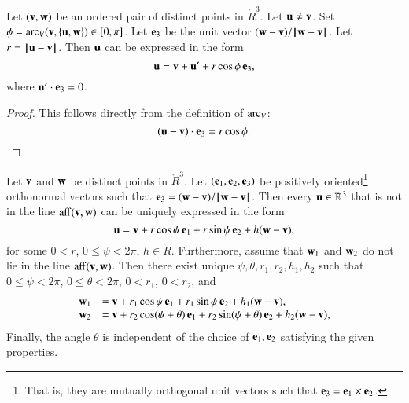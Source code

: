 \begin{lemma}[zenith]
Let $(\v,\w)$ be an ordered pair of distinct points in $\ring{R}^3$.
Let $\u\ne \v$.  Set $\phi = \arc_V(\v,\{\u,\w\})\in[0,\pi]$.
Let $\e_3$ be the unit vector $(\w-\v)/\norm{\w}{\v}$.  Let $r = \norm{\u}{\v}$.
Then $\u$
can be expressed in the form
   $$
   \u = \v + \u' +
   r\cos\phi\, \e_3,
   $$
where $\u'\cdot \e_3 = 0$.
%
%
%
\end{lemma}

\begin{proof} This follows directly from the definition of $\arc_V$:
  $$(\u-\v)\cdot \e_3 = r\cos\phi.$$
\end{proof}



\begin{lemma}
Let $\v$ and $\w$ be distinct points in 
$\ring{R}^3$.  Let $(\e_1,\e_2,\e_3)$ be positively oriented\footnote{That is, they are mutually orthogonal unit vectors such that $\e_3 = \e_1 \times \e_2$.} orthonormal
vectors such that $\e_3 = (\w-\v)/\norm{\w}{\v}$.
Then every
$\u\in\ring{R}^3$ that is not in the line $\op{aff}(\v,\w)$
can be uniquely expressed in the form
   $$
   \u = \v + r\cos\psi\, \e_1 + r\sin\psi\, \e_2 + h (\w-\v),
   $$
%
%
for some $0< r$, $0\le \psi < 2\pi$, $h\in\ring{R}$.
Furthermore,
assume that $\w_1$ and $\w_2$ do
not lie in the line $\op{aff}(\v,\w)$.
Then there exist unique $\psi,\theta,r_1,r_2,h_1,h_2$
 such
that $0\le\psi<2\pi$, $0\le\theta < 2\pi$, $0 < r_1$, $0 < r_2$, and
  $$
  \begin{array}{lll}
    \w_1 &= \v + r_1\cos\psi\, \e_1 + r_1\sin\psi\, \e_2 + h_1(\w-\v),\\
    \w_2 &= \v + r_2\cos(\psi+\theta)\, \e_1 + r_2\sin(\psi+\theta)\, \e_2 
     + h_2(\w-\v),\\
\end{array}
  $$
Finally, the angle $\theta$ is independent of the choice of $\e_1,\e_2$
satisfying the given properties.
\end{lemma}
%
%
%
%
%
%

